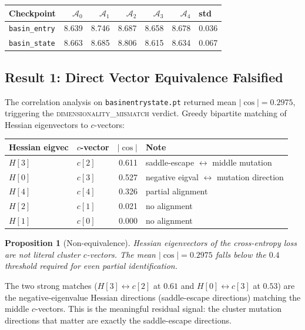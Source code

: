 \documentclass[11pt]{amsart}
\newtheorem{proposition}[theorem]{Proposition}
\begin{document}
\begin{center}
\small
\begin{tabular}{@{}lrrrrrl@{}}
\toprule
Checkpoint & $\mathcal{A}_0$ & $\mathcal{A}_1$ & $\mathcal{A}_2$
           & $\mathcal{A}_3$ & $\mathcal{A}_4$ & std \\
\midrule
\texttt{basin\_entry} & 8.639 & 8.746 & 8.687 & 8.658 & 8.678 & 0.036 \\
\texttt{basin\_state} & 8.663 & 8.685 & 8.806 & 8.615 & 8.634 & 0.067 \\
\bottomrule
\end{tabular}
\end{center}

\subsection{Result 1: Direct Vector Equivalence Falsified}
\label{sec:cluster_negative}

The correlation analysis on \texttt{basin\discretionary{\_}{}{\_}entry\discretionary{\_}{}{\_}state.pt} returned
mean $|\cos| = 0.2975$, triggering the \textsc{dimensionality\_mismatch} verdict.
Greedy bipartite matching of Hessian eigenvectors to $c$-vectors:

\begin{center}
\small
\begin{tabular}{@{}llrp{5.5cm}@{}}
\toprule
Hessian eigvec & $c$-vector & $|\cos|$ & Note \\
\midrule
$H[3]$ & $c[2]$ & 0.611 & saddle-escape $\leftrightarrow$ middle mutation \\
$H[0]$ & $c[3]$ & 0.527 & negative eigval $\leftrightarrow$ mutation direction \\
$H[4]$ & $c[4]$ & 0.326 & partial alignment \\
$H[2]$ & $c[1]$ & 0.021 & no alignment \\
$H[1]$ & $c[0]$ & 0.000 & no alignment \\
\bottomrule
\end{tabular}
\end{center}

\begin{proposition}[Non-equivalence]
Hessian eigenvectors of the cross-entropy loss are \emph{not} literal
cluster $c$-vectors.
The mean $|\cos|=0.2975$ falls below the $0.4$ threshold required for
even partial identification.
\end{proposition}

The two strong matches ($H[3]\leftrightarrow c[2]$ at $0.61$ and
$H[0]\leftrightarrow c[3]$ at $0.53$) are the negative-eigenvalue
Hessian directions (saddle-escape directions) matching the middle
$c$-vectors.
This is the meaningful residual signal: the cluster mutation directions
that matter are exactly the saddle-escape directions.
\end{document}
